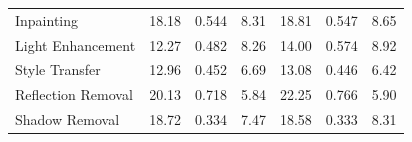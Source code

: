 \begin{minipage}{\columnwidth}
\begin{tabularx}{\columnwidth}{l*{6}{C}}
Inpainting
& 18.18 & 0.544 & 8.31
& 18.81 & 0.547 & 8.65 \\

Light Enhancement
& 12.27 & 0.482 & 8.26
& 14.00 & 0.574 & 8.92 \\

Style Transfer
& 12.96 & 0.452 & 6.69
& 13.08 & 0.446 & 6.42 \\

Reflection Removal
& 20.13 & 0.718 & 5.84
& 22.25 & 0.766 & 5.90 \\

Shadow Removal
& 18.72 & 0.334 & 7.47
& 18.58 & 0.333 & 8.31 \\

\bottomrule
\end{tabularx}
\end{minipage}
